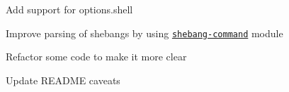 
\begin{DoxyItemize}
\item Add support for {\ttfamily options.\+shell}
\item Improve parsing of shebangs by using \href{https://github.com/kevva/shebang-command}{\tt {\ttfamily shebang-\/command}} module
\item Refactor some code to make it more clear
\item Update R\+E\+A\+D\+ME caveats 
\end{DoxyItemize}